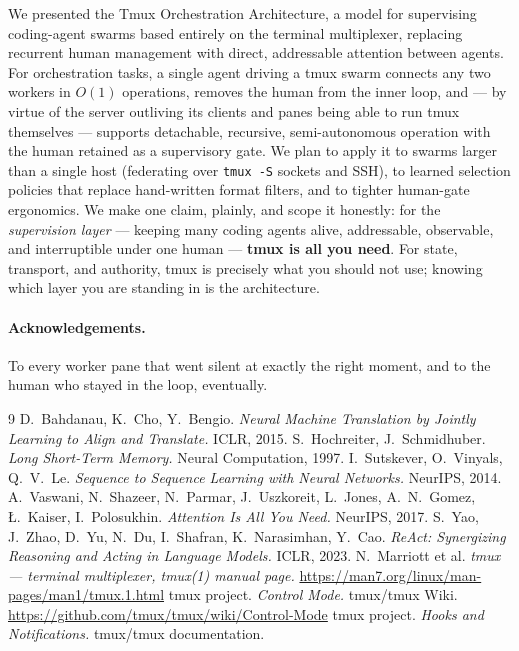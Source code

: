 \documentclass[10pt]{article}
\newcommand{\code}[1]{\texttt{\small #1}}
\begin{document}
We presented the Tmux Orchestration Architecture, a model for supervising coding-agent
swarms based entirely on the terminal multiplexer, replacing recurrent human
management with direct, addressable attention between agents. For orchestration tasks,
a single agent driving a tmux swarm connects any two workers in $O(1)$ operations,
removes the human from the inner loop, and --- by virtue of the server outliving its
clients and panes being able to run tmux themselves --- supports detachable, recursive,
semi-autonomous operation with the human retained as a supervisory gate. We plan to
apply it to swarms larger than a single host (federating over \code{tmux -S} sockets
and SSH), to learned selection policies that replace hand-written format filters, and
to tighter human-gate ergonomics. We make one claim, plainly, and scope it
honestly: for the \emph{supervision layer} --- keeping many coding agents alive,
addressable, observable, and interruptible under one human --- \textbf{tmux is all
you need}. For state, transport, and authority, tmux is precisely what you should
not use; knowing which layer you are standing in is the architecture.

\paragraph{Acknowledgements.} To every worker pane that went silent at exactly the
right moment, and to the human who stayed in the loop, eventually.

\begin{thebibliography}{9}
\small
{} D.~Bahdanau, K.~Cho, Y.~Bengio.
  \emph{Neural Machine Translation by Jointly Learning to Align and Translate.} ICLR, 2015.
 S.~Hochreiter, J.~Schmidhuber.
  \emph{Long Short-Term Memory.} Neural Computation, 1997.
 I.~Sutskever, O.~Vinyals, Q.~V.~Le.
  \emph{Sequence to Sequence Learning with Neural Networks.} NeurIPS, 2014.
 A.~Vaswani, N.~Shazeer, N.~Parmar, J.~Uszkoreit, L.~Jones,
  A.~N.~Gomez, {\L}.~Kaiser, I.~Polosukhin.
  \emph{Attention Is All You Need.} NeurIPS, 2017.
 S.~Yao, J.~Zhao, D.~Yu, N.~Du, I.~Shafran, K.~Narasimhan, Y.~Cao.
  \emph{ReAct: Synergizing Reasoning and Acting in Language Models.} ICLR, 2023.
 N.~Marriott et al. \emph{tmux --- terminal multiplexer, tmux(1) manual page.}
  \url{https://man7.org/linux/man-pages/man1/tmux.1.html}
 tmux project. \emph{Control Mode.} tmux/tmux Wiki.
  \url{https://github.com/tmux/tmux/wiki/Control-Mode}
 tmux project. \emph{Hooks and Notifications.} tmux/tmux documentation.
\end{thebibliography}
\end{document}
